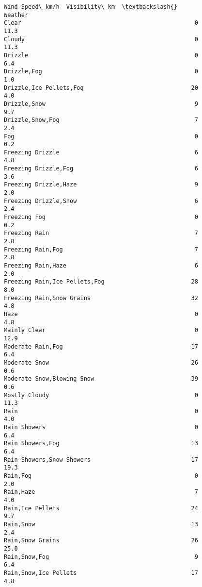 \documentclass[11pt]{article}
\begin{document}
\begin{tcolorbox}[breakable, size=fbox, boxrule=.5pt, pad at break*=1mm, opacityfill=0]
\begin{Verbatim}[commandchars=\\\{\}]
                                         Wind Speed\_km/h  Visibility\_km  \textbackslash{}
Weather
Clear                                                  0           11.3
Cloudy                                                 0           11.3
Drizzle                                                0            6.4
Drizzle,Fog                                            0            1.0
Drizzle,Ice Pellets,Fog                               20            4.0
Drizzle,Snow                                           9            9.7
Drizzle,Snow,Fog                                       7            2.4
Fog                                                    0            0.2
Freezing Drizzle                                       6            4.8
Freezing Drizzle,Fog                                   6            3.6
Freezing Drizzle,Haze                                  9            2.0
Freezing Drizzle,Snow                                  6            2.4
Freezing Fog                                           0            0.2
Freezing Rain                                          7            2.8
Freezing Rain,Fog                                      7            2.8
Freezing Rain,Haze                                     6            2.0
Freezing Rain,Ice Pellets,Fog                         28            8.0
Freezing Rain,Snow Grains                             32            4.8
Haze                                                   0            4.8
Mainly Clear                                           0           12.9
Moderate Rain,Fog                                     17            6.4
Moderate Snow                                         26            0.6
Moderate Snow,Blowing Snow                            39            0.6
Mostly Cloudy                                          0           11.3
Rain                                                   0            4.0
Rain Showers                                           0            6.4
Rain Showers,Fog                                      13            6.4
Rain Showers,Snow Showers                             17           19.3
Rain,Fog                                               0            2.0
Rain,Haze                                              7            4.0
Rain,Ice Pellets                                      24            9.7
Rain,Snow                                             13            2.4
Rain,Snow Grains                                      26           25.0
Rain,Snow,Fog                                          9            6.4
Rain,Snow,Ice Pellets                                 17            4.8

\end{Verbatim}
\end{tcolorbox}
\end{document}
